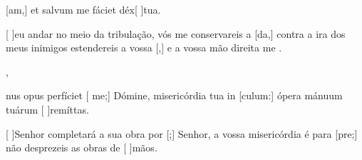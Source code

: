 {{      [am,] et salvum me fáciet déx[ ]{tu}a.~\Antiphona}%
    {\item {}[ ]{eu} andar no meio da tribulação, vós me conservareis a [da,] contra a ira dos meus inimigos estendereis a vossa [,] e a vossa mão direita me .~\Antiphona},
  {\item {}nus opus perfíciet [ me;] Dómine, misericórdia tua in [culum:] ópera mánuum tuárum
      [ ]{re}{mít}tas.~\Antiphona}%
    {\item {}[ ]{Se}nhor completará a sua obra por [;] Senhor, a vossa misericórdia é para [pre;] não desprezeis as obras de [ ]{mãos}.~\Antiphona}
}